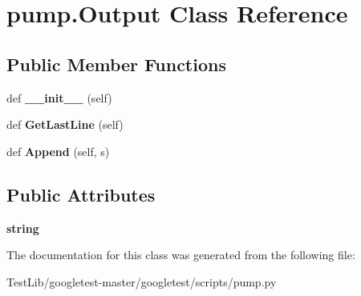 \hypertarget{classpump_1_1Output}{}\section{pump.\+Output Class Reference}
\label{classpump_1_1Output}
\subsection*{Public Member Functions}
\begin{DoxyCompactItemize}
\item 
\mbox{\label{classpump_1_1Output_a01a703055e40078561bd4a5011de4a6d}} 
def {\bfseries \+\_\+\+\_\+init\+\_\+\+\_\+} (self)
\item 
\mbox{\label{classpump_1_1Output_a6ece94d24be171bae2a2234c052b4c58}} 
def {\bfseries Get\+Last\+Line} (self)
\item 
\mbox{\label{classpump_1_1Output_a6f284bb3f80e03594bc28286c695f5a7}} 
def {\bfseries Append} (self, s)
\end{DoxyCompactItemize}
\subsection*{Public Attributes}
\begin{DoxyCompactItemize}
\item 
\mbox{\label{classpump_1_1Output_a8786848ab3d235189379c449a446f883}} 
{\bfseries string}
\end{DoxyCompactItemize}


The documentation for this class was generated from the following file\+:\begin{DoxyCompactItemize}
\item 
Test\+Lib/googletest-\/master/googletest/scripts/pump.\+py\end{DoxyCompactItemize}
